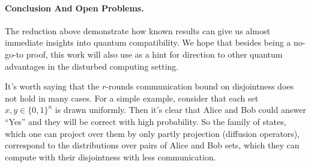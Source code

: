 \documentclass{article}
\begin{document}
\paragraph{Conclusion And Open Problems.} The reduction above demonstrate how known results can give us almost immediate insights into quantum compatibility. We hope that besides being a no-go-to proof, this work will also use as a hint for direction to other quantum advantages in the disturbed computing setting. 

It's worth saying that the $r$-rounds communication bound on disjointness does not hold in many cases. For a simple example, consider that each set $x,y \in \{0,1\}^{n}$ is drawn uniformly. Then it's clear that Alice and Bob could answer ``Yes'' and they will be correct with high probability. So the family of states, which one can project over them by only partly projection (diffusion operators), correspond to the distributions over pairs of Alice and Bob sets, which they can compute with their disjointness with less communication.        
\printbibliography 
\end{document}
